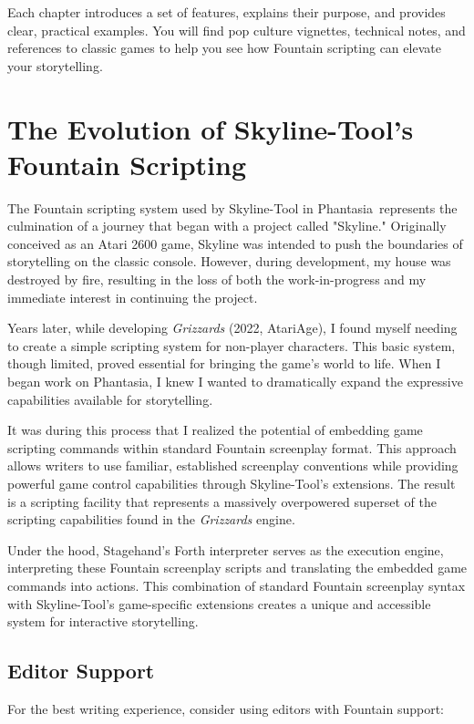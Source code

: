\documentclass[11pt,letterpaper,oldstylefigures]{memoir}
\newcommand{\Phantasia}{{\irishfont Phantasia}}
\begin{document}
Each chapter introduces a set of features, explains their purpose, and provides clear, practical examples. You will find pop culture vignettes, technical notes, and references to classic games to help you see how Fountain scripting can elevate your storytelling.

\section{The Evolution of Skyline-Tool's Fountain Scripting}

The Fountain scripting system used by Skyline-Tool in \Phantasia\ represents the culmination of a journey that began with a project called "Skyline." Originally conceived as an Atari 2600 game, Skyline was intended to push the boundaries of storytelling on the classic console. However, during development, my house was destroyed by fire, resulting in the loss of both the work-in-progress and my immediate interest in continuing the project.

Years later, while developing \textit{Grizzards} (2022, AtariAge), I found myself needing to create a simple scripting system for non-player characters. This basic system, though limited, proved essential for bringing the game's world to life. When I began work on \Phantasia, I knew I wanted to dramatically expand the expressive capabilities available for storytelling.

It was during this process that I realized the potential of embedding game scripting commands within standard Fountain screenplay format. This approach allows writers to use familiar, established screenplay conventions while providing powerful game control capabilities through Skyline-Tool's extensions. The result is a scripting facility that represents a massively overpowered superset of the scripting capabilities found in the \textit{Grizzards} engine.

Under the hood, Stagehand's Forth interpreter serves as the execution engine, interpreting these Fountain screenplay scripts and translating the embedded game commands into actions. This combination of standard Fountain screenplay syntax with Skyline-Tool's game-specific extensions creates a unique and accessible system for interactive storytelling.

\subsection{Editor Support}

For the best writing experience, consider using editors with Fountain support:
\end{document}

